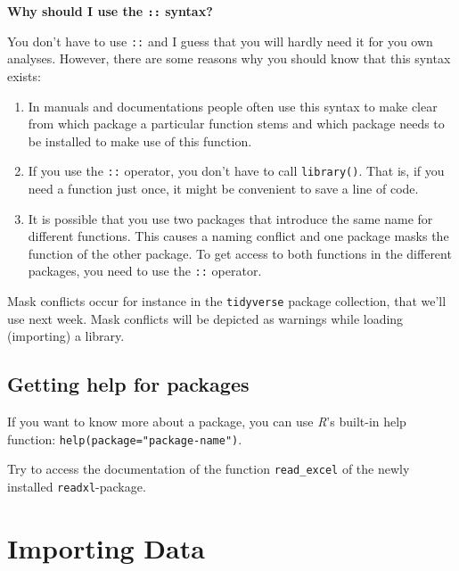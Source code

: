 \documentclass[
]{scrartcl}
\makeatletter
\providecommand{\tightlist}{%
  \setlength{\itemsep}{0pt}\setlength{\parskip}{0pt}}
\newenvironment{kframe}{%
\medskip{}
\setlength{\fboxsep}{.8em}
 \def\at@end@of@kframe{}%
 \ifinner\ifhmode%
  \def\at@end@of@kframe{\end{minipage}}%
  \begin{minipage}{\columnwidth}%
 \fi\fi%
 \def\FrameCommand##1{\hskip\@totalleftmargin \hskip-\fboxsep
 \colorbox{shadecolor}{##1}\hskip-\fboxsep
     \hskip-\linewidth \hskip-\@totalleftmargin \hskip\columnwidth}%
 \MakeFramed {\advance\hsize-\width
   \@totalleftmargin\z@ \linewidth\hsize
   \@setminipage}}%
 {\par\unskip\endMakeFramed%
 \at@end@of@kframe}
\newenvironment{rmdblock}[1]
  {
  \begin{itemize}
  \renewcommand{\labelitemi}{
    \raisebox{-.7\height}[0pt][0pt]{
      {\setkeys{Gin}{width=3em,keepaspectratio}\texttt{[image: images/\#1]}}
    }
  }
  \setlength{\fboxsep}{1em}
  \begin{kframe}
  \item
  }
  {
  \end{kframe}
  \end{itemize}
  }
\newenvironment{geek}
    {\begin{rmdblock}{geek}}
    {\end{rmdblock}}
\newenvironment{myexercise}
    {\begin{rmdblock}{exercise_green}}
    {\end{rmdblock}}
\makeatother
\begin{document}
\textbf{Why should I use the \texttt{::} syntax?}

You don't have to use \texttt{::} and I guess that you will hardly need it for you own analyses. However, there are some reasons why you should know that this syntax exists:

\begin{enumerate}
\def\labelenumi{\arabic{enumi}.}
\tightlist
\item
  In manuals and documentations people often use this syntax to make clear from which package a particular function stems and which package needs to be installed to make use of this function.
\item
  If you use the \texttt{::} operator, you don't have to call \texttt{library()}. That is, if you need a function just once, it might be convenient to save a line of code.
\item
  It is possible that you use two packages that introduce the same name for different functions. This causes a naming conflict and one package masks the function of the other package. To get access to both functions in the different packages, you need to use the \texttt{::} operator.
\end{enumerate}

\begin{geek}
Mask conflicts occur for instance in the \texttt{tidyverse} package
collection, that we'll use next week. Mask conflicts will be depicted as
warnings while loading (importing) a library.
\end{geek}

\hypertarget{getting-help-for-packages}{%
\subsection{Getting help for packages}\label{getting-help-for-packages}}

If you want to know more about a package, you can use \emph{R}'s built-in help function: \texttt{help(package="package-name")}.

\begin{myexercise}
Try to access the documentation of the function \texttt{read\_excel} of
the newly installed \texttt{readxl}-package.
\end{myexercise}

\hypertarget{importing-data}{%
\section{Importing Data}\label{importing-data}}
\end{document}

